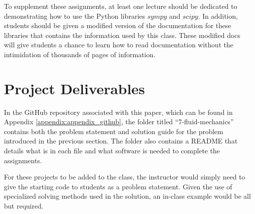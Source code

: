 To supplement these assignments, at least
one lecture should be dedicated to demonstrating how to use the Python libraries $sympy$ and $scipy$. In addition,
students should be given a modified version of the documentation for these libraries that contains the information
used by this class. These modified docs will give students a chance to learn how to read documentation without the
intimidation of thousands of pages of information.

\section{Project Deliverables}

In the GitHub repository associated with this paper, which can be found in 
Appendix \ref{appendix:appendix_github}, the folder titled ``7-fluid-mechanics''
contains both the problem statement and solution guide for the problem introduced in 
the previous section. The folder also contains a README that details what is in each file and 
what software is needed to complete the assignments. 

For these projects to be added to the class, the instructor would simply need to give the 
starting code to students as a problem statement. Given the use of specialized solving
methods used in the solution, an in-class example would be all but required.
